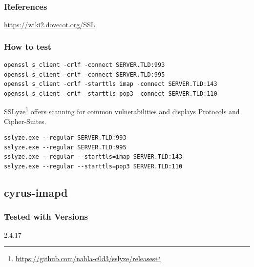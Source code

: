 

\subsubsection{References}
\begin{itemize*}
  \item \url{https://wiki2.dovecot.org/SSL}
\end{itemize*}


\subsubsection{How to test}
\begin{lstlisting}
openssl s_client -crlf -connect SERVER.TLD:993
openssl s_client -crlf -connect SERVER.TLD:995
openssl s_client -crlf -starttls imap -connect SERVER.TLD:143
openssl s_client -crlf -starttls pop3 -connect SERVER.TLD:110
\end{lstlisting}

SSLyze\footnote{\url{https://github.com/nabla-c0d3/sslyze/releases}} offers scanning for common vulnerabilities and displays Protocols and Cipher-Suites.
\begin{lstlisting}
sslyze.exe --regular SERVER.TLD:993
sslyze.exe --regular SERVER.TLD:995
sslyze.exe --regular --starttls=imap SERVER.TLD:143
sslyze.exe --regular --starttls=pop3 SERVER.TLD:110
\end{lstlisting}



\subsection{cyrus-imapd}
\subsubsection{Tested with Versions}
\begin{itemize*}
  \item 2.4.17
\end{itemize*}

